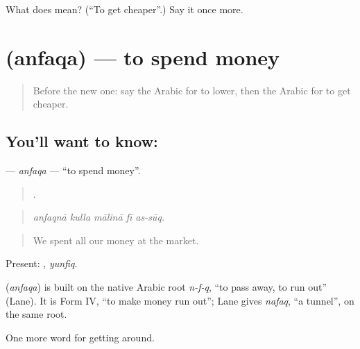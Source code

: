 \begin{tcolorbox}[breakable,colback=teal!4,colframe=teal!35!black,title={Before you move on}]
What does  mean? (\textquotedblleft{}To get cheaper\textquotedblright{}.) Say it once more.
\end{tcolorbox}
\section[\texorpdfstring{\ar{أنفق} (anfaqa)}{أنفق (anfaqa)}]{ (anfaqa) — to spend money}

\label{lesson:AR-C457-anfaqa}



\begin{quote}
Before the new one: say the Arabic for to lower, then the Arabic for to get cheaper.
\end{quote}

\subsection*{You'll want to know: }
\textbf{} — \emph{anfaqa} — \textquotedblleft{}to spend money\textquotedblright{}.

\begin{quote}
    .
\end{quote}

\begin{quote}
\emph{anfaqnā kulla mālinā fī as-sūq.}
\end{quote}

\begin{quote}
We spent all our money at the market.
\end{quote}

Present: , \emph{yunfiq}.

\begin{cousinweb}
\textbf{} (\emph{anfaqa}) is built on the native Arabic root \emph{n-f-q}, \textquotedblleft{}to pass away, to run out\textquotedblright{} (Lane). It is Form IV, \textquotedblleft{}to make money run out\textquotedblright{}; Lane gives \emph{nafaq}, \textquotedblleft{}a tunnel\textquotedblright{}, on the same root.
\end{cousinweb}

\begin{grammarlens}[title={What you've built}]
One more word for getting around.
\end{grammarlens}

